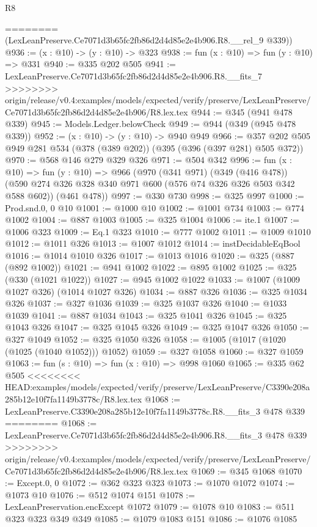 \begin{lexlean}{R8}
\begin{coremodule}
{{{{{{{{{{{{{{{{{{{{{{{========
      (LexLeanPreserve.Ce7071d3b65fc2fb86d2d4d85e2e4b906.R8.__rel_9 @339))
@936 := (x : @10) -> (y : @10) -> @323
@938 := fun (x : @10) => fun (y : @10) => @331
@940 := @335 @202 @505
@941 := LexLeanPreserve.Ce7071d3b65fc2fb86d2d4d85e2e4b906.R8.__fits_7
>>>>>>>> origin/release/v0.4:examples/models/expected/verify/preserve/LexLeanPreserve/Ce7071d3b65fc2fb86d2d4d85e2e4b906/R8.lex.tex
@944 := @345 (@941 @478 @339)
@945 := Models.Ledger.belowCheck
@949 := @944 (@349 (@945 @478 @339))
@952 := (x : @10) -> (y : @10) -> @940 @949
@966 := @357 @202 @505 @949 @281 @534 (@378 (@389 @202)) (@395 (@396 (@397 @281) @505 @372))
@970 := @568 @146 @279 @329 @326
@971 := @504 @342
@996 := fun (x : @10) =>
  fun (y : @10) =>
  @966
    (@970
      (@341 @971)
      (@349 (@416 @478))
      (@590 @274 @326 @328 @340 @971 @600 (@576 @74 @326 @326 @503 @342 @588 @602))
      (@461 @478))
@997 := @330 @730
@998 := @325 @997
@1000 := Prod.snd.{0, 0} @10
@1001 := @1000 @10
@1002 := @1001 @734
@1003 := @774 @1002
@1004 := @887 @1003
@1005 := @325 @1004
@1006 := ite.{1}
@1007 := @1006 @323
@1009 := Eq.{1} @323
@1010 := @777 @1002
@1011 := @1009 @1010
@1012 := @1011 @326
@1013 := @1007 @1012
@1014 := instDecidableEqBool
@1016 := @1014 @1010 @326
@1017 := @1013 @1016
@1020 := @325 (@887 (@892 @1002))
@1021 := @941 @1002
@1022 := @895 @1002
@1025 := @325 (@330 (@1021 @1022))
@1027 := @945 @1002 @1022
@1033 := @1007 (@1009 @1027 @326) (@1014 @1027 @326)
@1034 := @887 @326
@1036 := @325 @1034 @326
@1037 := @327 @1036
@1039 := @325 @1037 @326
@1040 := @1033 @1039
@1041 := @887 @1034
@1043 := @325 @1041 @326
@1045 := @325 @1043 @326
@1047 := @325 @1045 @326
@1049 := @325 @1047 @326
@1050 := @327 @1049
@1052 := @325 @1050 @326
@1058 := @1005 (@1017 (@1020 (@1025 (@1040 @1052))) @1052)
@1059 := @327 @1058
@1060 := @327 @1059
@1063 := fun (s : @10) => fun (x : @10) => @998 @1060
@1065 := @335 @62 @505
<<<<<<<< HEAD:examples/models/expected/verify/preserve/LexLeanPreserve/C3390e208a285b12e10f7fa1149b3778c/R8.lex.tex
@1068 := LexLeanPreserve.C3390e208a285b12e10f7fa1149b3778c.R8.__fits_3 @478 @339
========
@1068 := LexLeanPreserve.Ce7071d3b65fc2fb86d2d4d85e2e4b906.R8.__fits_3 @478 @339
>>>>>>>> origin/release/v0.4:examples/models/expected/verify/preserve/LexLeanPreserve/Ce7071d3b65fc2fb86d2d4d85e2e4b906/R8.lex.tex
@1069 := @345 @1068
@1070 := Except.{0, 0}
@1072 := @362 @323 @323
@1073 := @1070 @1072
@1074 := @1073 @10
@1076 := @512 @1074 @151
@1078 := LexLeanPreservation.encExcept @1072
@1079 := @1078 @10
@1083 := @511 @323 @323 @349 @349
@1085 := @1079 @1083 @151
@1086 := @1076 @1085
}}}}}}}}}}}}}}}}}}}}}}}
\end{coremodule}
\end{lexlean}
